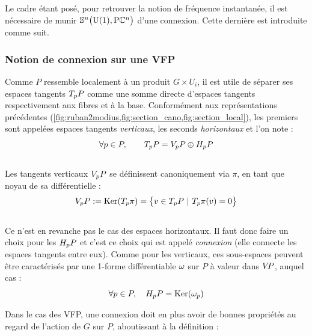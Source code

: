Le cadre étant posé, pour retrouver la notion de fréquence instantanée, il est nécessaire de munir $\VFP$ d'une connexion. Cette dernière est introduite comme suit.

\subsubsection{Notion de connexion sur une VFP}
\label{subsec:def2conn}

Comme $P$ ressemble localement à un produit $G\times U_i$, il est utile de séparer ses espaces tangents $\tg[p]{P}$ comme une somme directe d'espaces tangents respectivement aux fibres et à la base. Conformément aux représentations précédentes (\cref{fig:ruban2modius,fig:section_cano,fig:section_local}), les premiers sont appelées espaces tangents \emph{verticaux}, les seconds \emph{horizontaux} et l'on note :
\[\forall p\in P,\qquad \tg[p]{P} = \vg[p]{P} \oplus \hg[p]{P}\]
\\
Les tangents verticaux $\vg[p]{P}$ se définissent canoniquement via $\pi$, en tant que noyau de sa différentielle :
\[\vg[p]{P} \defeq \Ker (\tg[p]{\pi}) = \big\{ v\in\tg[p]{P}\ |\ \tg[p]{\pi}(v)=0 \big\}\]
\\ 
Ce n'est en revanche pas le cas des espaces horizontaux. Il faut donc faire un choix pour les $\hg[p]{P}$ et c'est ce choix qui est appelé \emph{connexion} (elle connecte les espaces tangents entre eux).
Comme pour les verticaux, ces sous-espaces peuvent être caractérisés par une 1-forme différentiable $\conn$ sur $P$ à valeur dans $\vg{P}$, auquel cas :
\[\forall p\in P,\quad \hg[p]{P} = \Ker(\conn_p)\]
\skipl

Dans le cas des VFP, une connexion doit en plus avoir de bonnes propriétés au regard de l'action de $G$ sur $P$, aboutissant à la définition :

